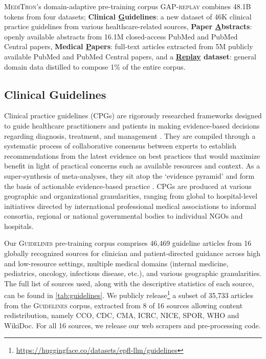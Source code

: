 \documentclass{article}
\newcommand{\guidelines}{\textsc{Guidelines} }
\newcommand{\mtron}{\textsc{MediTron}\xspace}
\begin{document}
\mtron’s domain-adaptive pre-training corpus \textsc{GAP-replay} combines 48.1B tokens from four datasets; 
\textbf{Clinical \underline{G}uidelines}: a new dataset of 46K clinical practice guidelines from various healthcare-related sources, 
\textbf{Paper \underline{A}bstracts}: openly available abstracts from 16.1M closed-access PubMed and PubMed Central papers, 
\textbf{Medical \underline{P}apers}: full-text articles extracted from 5M publicly available PubMed and PubMed Central papers, and a \textbf{\underline{Replay} dataset}: general domain data distilled to compose 1\% of the entire corpus. 

\subsection{Clinical Guidelines} 
\label{sec:2-data-guidelines}


Clinical practice guidelines (CPGs) are rigorously researched frameworks designed to guide healthcare practitioners and patients in making evidence-based decisions regarding diagnosis, treatment, and management \citep{Berg_Atkins_Tierney_1997}. They are compiled through a systematic process of collaborative consensus between experts to establish recommendations from the latest evidence on best practices that would maximize benefit in light of practical concerns such as available resources and context. As a super-synthesis of meta-analyses, they sit atop the `evidence pyramid' and form the basis of actionable evidence-based practice \citep{Burns_Rohrich_Chung_2011}. 
CPGs are produced at various geographic and organizational granularities, ranging from global to hospital-level initiatives directed by international professional medical associations to informal consortia, regional or national governmental bodies to individual NGOs and hospitals. 

Our \guidelines pre-training corpus comprises 46,469 guideline articles from 16 globally recognized sources for clinician and patient-directed guidance across high and low-resource settings, multiple medical domains (internal medicine, pediatrics, oncology, infectious disease, etc.), and various geographic granularities. 
The full list of sources used, along with the descriptive statistics of each source, can be found in \autoref{tab:guidelines}.
We publicly release\footnote{\url{https://huggingface.co/datasets/epfl-llm/guidelines}} a subset of 35,733 articles from the \guidelines corpus, extracted from 8 of 16 sources allowing content redistribution, namely CCO, CDC, CMA, ICRC, NICE, SPOR, WHO and WikiDoc. For all 16 sources, we release our web scrapers and pre-processing code. 
\end{document}

